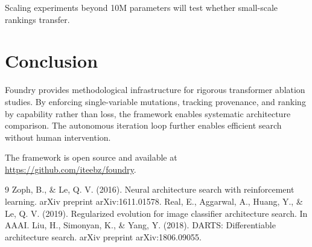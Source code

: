 \documentclass{article}
\begin{document}
Scaling experiments beyond 10M parameters will test whether small-scale rankings transfer.

\section{Conclusion}

Foundry provides methodological infrastructure for rigorous transformer ablation studies. By enforcing single-variable mutations, tracking provenance, and ranking by capability rather than loss, the framework enables systematic architecture comparison. The autonomous iteration loop further enables efficient search without human intervention.

The framework is open source and available at \url{https://github.com/iteebz/foundry}.

\begin{thebibliography}{9}
 Zoph, B., \& Le, Q. V. (2016). Neural architecture search with reinforcement learning. arXiv preprint arXiv:1611.01578.
 Real, E., Aggarwal, A., Huang, Y., \& Le, Q. V. (2019). Regularized evolution for image classifier architecture search. In AAAI.
 Liu, H., Simonyan, K., \& Yang, Y. (2018). DARTS: Differentiable architecture search. arXiv preprint arXiv:1806.09055.
\end{thebibliography}
\end{document}
